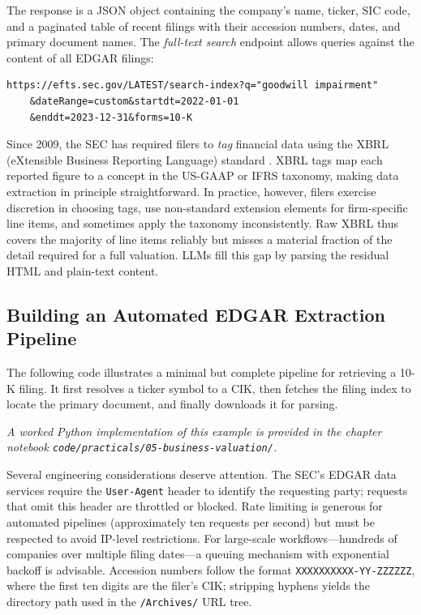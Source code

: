 \begin{context}
The response is a JSON object containing the company's name, ticker, SIC code, and a
paginated table of recent filings with their accession numbers, dates, and primary
document names. The \emph{full-text search} endpoint allows queries against the
content of all EDGAR filings:

\begin{verbatim}
https://efts.sec.gov/LATEST/search-index?q="goodwill impairment"
    &dateRange=custom&startdt=2022-01-01
    &enddt=2023-12-31&forms=10-K
\end{verbatim}

Since 2009, the SEC has required filers to \emph{tag} financial data using the XBRL
(eXtensible Business Reporting Language) standard \cite{sec2009xbrl}.
XBRL tags map each reported figure to a concept in the US-GAAP or IFRS taxonomy, making
data extraction in principle straightforward. In practice, however, filers exercise
discretion in choosing tags, use non-standard extension elements for firm-specific line
items, and sometimes apply the taxonomy inconsistently. Raw XBRL thus covers the
majority of line items reliably but misses a material fraction of the detail required for
a full valuation. LLMs fill this gap by parsing the residual HTML and plain-text content.

\subsection{Building an Automated EDGAR Extraction Pipeline}
\label{subsec:bv-extraction-pipeline}

The following code illustrates a minimal but complete pipeline for retrieving a 10-K
filing. It first resolves a ticker symbol to a CIK, then fetches the filing index to
locate the primary document, and finally downloads it for parsing.

\textit{A worked Python implementation of this example is provided in the chapter notebook \texttt{code/practicals/05-business-valuation/}.}

Several engineering considerations deserve attention. The SEC's EDGAR data services
require the \texttt{User-Agent} header to identify the requesting party; requests that
omit this header are throttled or blocked. Rate limiting is generous for automated
pipelines (approximately ten requests per second) but must be respected to avoid
IP-level restrictions. For large-scale workflows---hundreds of companies over multiple
filing dates---a queuing mechanism with exponential backoff is advisable. Accession
numbers follow the format \texttt{XXXXXXXXXX-YY-ZZZZZZ}, where the first ten digits
are the filer's CIK; stripping hyphens yields the directory path used in the
\texttt{/Archives/} URL tree.


\end{context}
